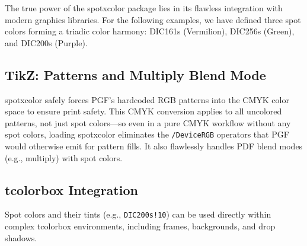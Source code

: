 \documentclass[luatex]{article}\listfiles
\begin{document}
The true power of the \textsf{spotxcolor} package lies in its flawless integration with modern graphics libraries.
For the following examples, we have defined three spot colors forming a triadic color harmony: \textcolor{DIC161s}{DIC161s} (Vermilion), \textcolor{DIC256s}{DIC256s} (Green), and \textcolor{DIC200s}{DIC200s} (Purple).

\subsection{TikZ: Patterns and Multiply Blend Mode}

\textsf{spotxcolor} safely forces PGF's hardcoded RGB patterns into the CMYK color space to ensure print safety.
This CMYK conversion applies to all uncolored patterns, not just spot colors---so even in a pure CMYK workflow without any spot colors, loading \textsf{spotxcolor} eliminates the \texttt{/DeviceRGB} operators that PGF would otherwise emit for pattern fills.
It also flawlessly handles PDF blend modes (e.g., multiply) with spot colors.

\vspace{1em}
\begin{center}
\end{center}
\vspace{1em}

\subsection{tcolorbox Integration}

Spot colors and their tints (e.g., \texttt{DIC200s!10}) can be used directly within complex \textsf{tcolorbox} environments, including frames, backgrounds, and drop shadows.
\end{document}
